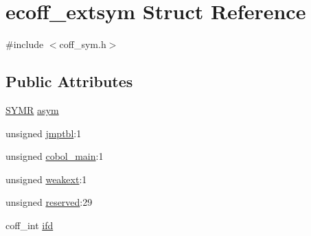 \hypertarget{structecoff__extsym}{
\section{ecoff\_\-extsym Struct Reference}
\label{structecoff__extsym}
}


{\ttfamily \#include $<$coff\_\-sym.h$>$}

\subsection*{Public Attributes}
\begin{DoxyCompactItemize}
\item 
\hyperlink{structecoff__sym}{SYMR} \hyperlink{structecoff__extsym_a87f587c09c222ba0922c7ee88c1a6b8b}{asym}
\item 
unsigned \hyperlink{structecoff__extsym_a803653253624913be2a4593db1429fb1}{jmptbl}:1
\item 
unsigned \hyperlink{structecoff__extsym_acbb40b2a7a64c4d3b141277f8cd7f735}{cobol\_\-main}:1
\item 
unsigned \hyperlink{structecoff__extsym_afc5d5b07df88423a1f2c1d11ad5b4caa}{weakext}:1
\item 
unsigned \hyperlink{structecoff__extsym_a190ce15962a8ce49490bbddc1574d11e}{reserved}:29
\item 
coff\_\-int \hyperlink{structecoff__extsym_add003edd8dbbaa77df9d6632e7cbefab}{ifd}
\end{DoxyCompactItemize}


